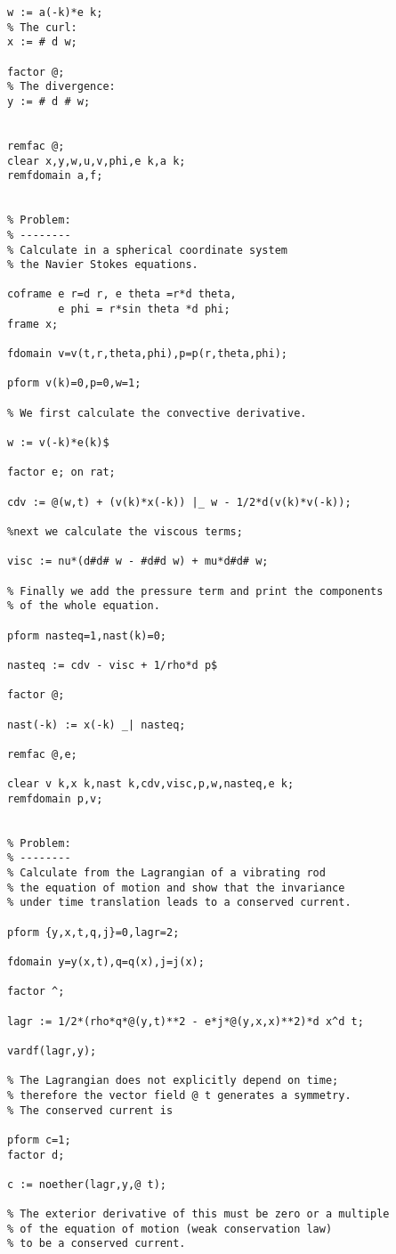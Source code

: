 {\begin{verbatim}
w := a(-k)*e k;
% The curl:
x := # d w;

factor @;
% The divergence:
y := # d # w;


remfac @;
clear x,y,w,u,v,phi,e k,a k;
remfdomain a,f;


% Problem:
% --------
% Calculate in a spherical coordinate system
% the Navier Stokes equations.

coframe e r=d r, e theta =r*d theta,
        e phi = r*sin theta *d phi;
frame x;

fdomain v=v(t,r,theta,phi),p=p(r,theta,phi);

pform v(k)=0,p=0,w=1;

% We first calculate the convective derivative.

w := v(-k)*e(k)$

factor e; on rat;

cdv := @(w,t) + (v(k)*x(-k)) |_ w - 1/2*d(v(k)*v(-k));

%next we calculate the viscous terms;

visc := nu*(d#d# w - #d#d w) + mu*d#d# w;

% Finally we add the pressure term and print the components
% of the whole equation.

pform nasteq=1,nast(k)=0;

nasteq := cdv - visc + 1/rho*d p$

factor @;

nast(-k) := x(-k) _| nasteq;

remfac @,e;

clear v k,x k,nast k,cdv,visc,p,w,nasteq,e k;
remfdomain p,v;


% Problem:
% --------
% Calculate from the Lagrangian of a vibrating rod
% the equation of motion and show that the invariance
% under time translation leads to a conserved current.

pform {y,x,t,q,j}=0,lagr=2;

fdomain y=y(x,t),q=q(x),j=j(x);

factor ^;

lagr := 1/2*(rho*q*@(y,t)**2 - e*j*@(y,x,x)**2)*d x^d t;

vardf(lagr,y);

% The Lagrangian does not explicitly depend on time;
% therefore the vector field @ t generates a symmetry.
% The conserved current is

pform c=1;
factor d;

c := noether(lagr,y,@ t);

% The exterior derivative of this must be zero or a multiple
% of the equation of motion (weak conservation law)
% to be a conserved current.


\end{verbatim}}
